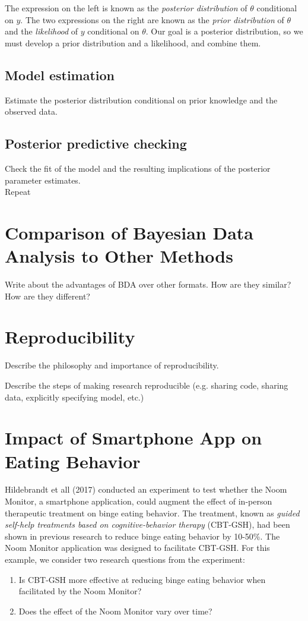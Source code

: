 \documentclass[12pt, oneside]{article}
\begin{document}
The expression on the left is known as the \emph{posterior distribution} of $\theta$ conditional on $y$.  The two expressions on the right are known as the \emph{prior distribution} of $\theta$ and the \emph{likelihood} of $y$ conditional on $\theta$.  Our goal is a posterior distribution, so we must develop a prior distribution and a likelihood, and combine them.

\subsection{Model estimation}
Estimate the posterior distribution conditional on prior knowledge and the observed data.
\subsection{Posterior predictive checking}
Check the fit of the model and the resulting implications of the posterior parameter estimates.
\\
Repeat

\section{Comparison of Bayesian Data Analysis to Other Methods}
Write about the advantages of BDA over other formats.  How are they similar?  How are they different?

\section{Reproducibility}
Describe the philosophy and importance of reproducibility.  

Describe the steps of making research reproducible (e.g. sharing code, sharing data, explicitly specifying model, etc.)

\section{Impact of Smartphone App on Eating Behavior}

Hildebrandt et all (2017) conducted an experiment to test whether the Noom Monitor, a smartphone application, could augment the effect of in-person therapeutic treatment on binge eating behavior.  The treatment, known as \emph{guided self-help treatments based on cognitive-behavior therapy} (CBT-GSH), had been shown in previous research to reduce binge eating behavior by 10-50\%.  The Noom Monitor application was designed to facilitate CBT-GSH.  For this example, we consider two research questions from the experiment:
\begin{enumerate}
\item{Is CBT-GSH more effective at reducing binge eating behavior when facilitated by the Noom Monitor?}
\item{Does the effect of the Noom Monitor vary over time?}
\end{enumerate}
\end{document}
